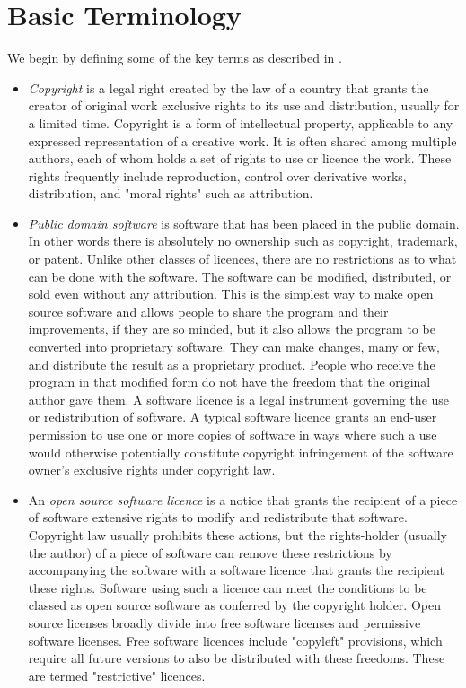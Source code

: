 \documentclass[12pt,a4paper]{article}
\begin{document}
\section{Basic Terminology}
\label{sec:BasicTerminology}

We begin by defining some of the key terms as described in \cite{[3]}.
\begin{itemize}
\item \textit{Copyright} is a legal right created by the law of a country that grants the creator of original work exclusive rights to its use and distribution, usually for a limited time. Copyright is a form of intellectual property, applicable to any expressed representation of a creative work. It is often shared among multiple authors, each of whom holds a set of rights to use or licence the work. These rights frequently include reproduction, control over derivative works, distribution, and "moral rights" such as attribution.

\item \textit{Public domain software} is software that has been placed in the public domain. In other words there is absolutely no ownership such as copyright, trademark, or patent. Unlike other classes of licences, there are no restrictions as to what can be done with the software. The software can be modified, distributed, or sold even without any attribution. This is the simplest way to make open source software and allows people to share the program and their improvements, if they are so minded, but it also allows the program to be converted into proprietary software. They can make changes, many or few, and distribute the result as a proprietary product. People who receive the program in that modified form do not have the freedom that the original author gave them. 
A software licence is a legal instrument governing the use or redistribution of software. A typical software licence grants an end-user permission to use one or more copies of software in ways where such a use would otherwise potentially constitute copyright infringement of the software owner's exclusive rights under copyright law.

\item An \textit{open source software licence} is a notice that grants the recipient of a piece of software extensive rights to modify and redistribute that software. Copyright law usually prohibits these actions, but the rights-holder (usually the author) of a piece of software can remove these restrictions by accompanying the software with a software licence that grants the recipient these rights. Software using such a licence can meet the conditions to be classed as open source software as conferred by the copyright holder. Open source licenses broadly divide into free software licenses and permissive software licenses.
Free software licences include "copyleft" provisions, which require all future versions to also be distributed with these freedoms. These are termed "restrictive" licences. 


\end{itemize}
\end{document}
